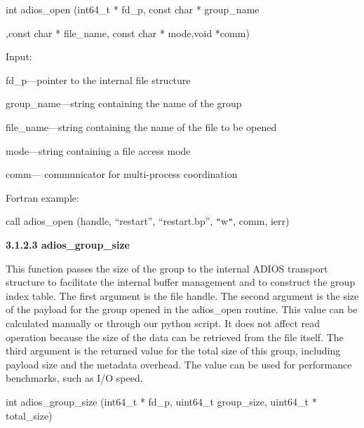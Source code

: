 \vspace{10pt}
\leftskip=103pt
\parindent=-81pt
int adios\_open (int64\_t * fd\_p, const char * group\_name

\vspace{10pt}
,const char * file\_name, const char * mode,void *comm)

\vspace{10pt}
\leftskip=22pt
\parindent=0pt
Input: 

\vspace{10pt}
\leftskip=36pt
fd\_p---pointer to the internal file structure

\vspace{10pt}
group\_name---string containing the name of the group 

\vspace{10pt}
file\_name---string containing the name of the file to be opened 

\vspace{10pt}
mode---string containing  a file access mode

\vspace{10pt}
comm--- communicator for multi-process coordination

\vspace{10pt}
\leftskip=22pt
Fortran example: 

\vspace{10pt}
\parindent=13pt
call adios\_open (handle, ``restart'', ``restart.bp'', \texttt{"}w\texttt{"}, comm, 
ierr)

\vspace{10pt}
\leftskip=0pt
\parindent=0pt
\textbf{3.1.2.3 adios\_group\_size}

\vspace{10pt}
This function passes the size of the group to the internal ADIOS transport structure 
to facilitate the internal buffer management and to construct the group index table. 
The first argument is the file handle. The second argument is the size of the payload 
for the group opened in the adios\_open routine. This value can be calculated manually 
or through our python script. It does not affect read operation because the size 
of the data can be retrieved from the file itself. The third argument is the returned 
value for the total size of this group, including payload size and the metadata 
overhead. The value can be used for performance benchmarks, such as I/O speed. 

\vspace{10pt}
\leftskip=22pt
int adios\_group\_size (int64\_t * fd\_p, uint64\_t group\_size, uint64\_t * total\_size)

